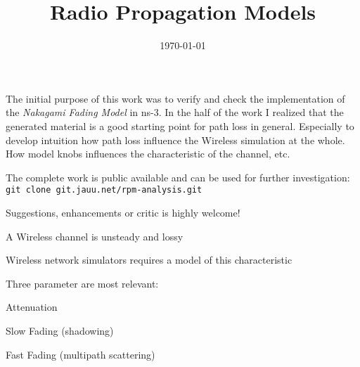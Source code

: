 \documentclass[9pt]{article}
\begin{document}
\title{Radio Propagation Models}

\subtitle{}

\company{}
\date{\today}
\maketitle

\begin{slide}
\bi
	\item The initial purpose of this work was to verify and
	      check the implementation of the \textit{Nakagami Fading Model}
		  in ns-3. In the half of the work I realized that the generated
		  material is a good starting point for path loss in general.
		  Especially to develop intuition how path loss influence the Wireless
		  simulation at the whole. How model knobs influences the
		  characteristic of the channel, etc.

	\item The complete work is public available and can be used for further
	      investigation:\newline
	      \verb+git clone git.jauu.net/rpm-analysis.git+

	\item Suggestions, enhancements or critic is highly welcome!
\ei
\end{slide}

\begin{slide}
\bi
	\item A Wireless channel is unsteady and lossy

	\item Wireless network simulators requires a model of this characteristic

	\item Three parameter are most relevant:

	\be
		\item Attenuation
		\item Slow Fading (shadowing)
		\item Fast Fading (multipath scattering)
	\ee
\ei
\end{slide}
\end{document}
